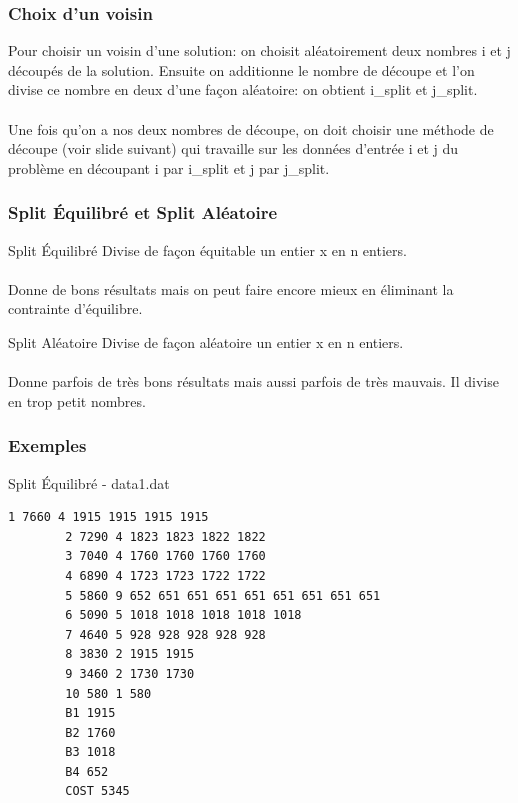 \documentclass{beamer}
\begin{document}
\begin{frame}
    \frametitle{Choix d'un voisin}
    Pour choisir un voisin d'une solution: on choisit aléatoirement deux nombres i et j découpés de la solution. Ensuite on additionne le nombre de découpe et l'on divise ce nombre en deux d'une façon aléatoire: on obtient i\_split et j\_split.\\~\\
    Une fois qu'on a nos deux nombres de découpe, on doit choisir une méthode de découpe (voir slide suivant) qui travaille sur les données d'entrée i et j du problème en découpant i par i\_split et j par j\_split. 
\end{frame}

\begin{frame}
    \frametitle{Split Équilibré et Split Aléatoire}
    \begin{block}{Split Équilibré}
    Divise de façon équitable un entier x en n entiers.\\~\\
    \MVRightarrow{} Donne de bons résultats mais on peut faire encore mieux en éliminant la contrainte d'équilibre.
    \end{block}

    \begin{block}{Split Aléatoire}
    Divise de façon aléatoire un entier x en n entiers.\\~\\
    \MVRightarrow{} Donne parfois de très bons résultats mais aussi parfois de très mauvais. Il divise en trop petit nombres.
    \end{block}
\end{frame}

\begin{frame}[fragile]
    \frametitle{Exemples}
    \begin{exampleblock}{Split Équilibré - data1.dat}
        \begin{lstlisting}[basicstyle=\small]
        1 7660 4 1915 1915 1915 1915 
        2 7290 4 1823 1823 1822 1822 
        3 7040 4 1760 1760 1760 1760 
        4 6890 4 1723 1723 1722 1722 
        5 5860 9 652 651 651 651 651 651 651 651 651 
        6 5090 5 1018 1018 1018 1018 1018 
        7 4640 5 928 928 928 928 928 
        8 3830 2 1915 1915 
        9 3460 2 1730 1730 
        10 580 1 580 
        B1 1915
        B2 1760
        B3 1018
        B4 652
        COST 5345
        \end{lstlisting}
    \end{exampleblock}
\end{frame}
\end{document}
